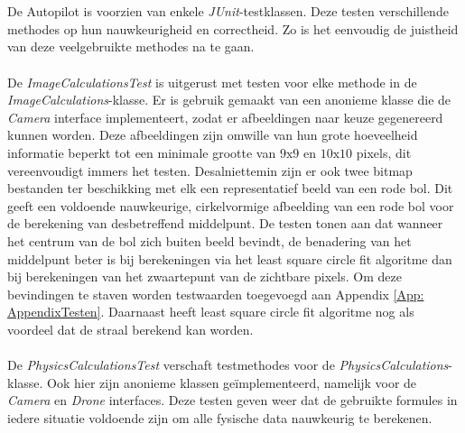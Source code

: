 \\
\\
De Autopilot is voorzien van enkele \textit{JUnit}-testklassen. Deze testen verschillende methodes op hun nauwkeurigheid en correctheid. Zo is het eenvoudig de juistheid van deze veelgebruikte methodes na te gaan.
\\
\\
De \textit{ImageCalculationsTest} is uitgerust met testen voor elke methode in de \textit{ImageCalculations}-klasse. Er is gebruik gemaakt van een anonieme klasse die de \textit{Camera} interface implementeert, zodat er afbeeldingen naar keuze gegenereerd kunnen worden. Deze afbeeldingen zijn omwille van hun grote hoeveelheid informatie beperkt tot een minimale grootte van \(9\text{x}9\) en \(10\text{x}10\) pixels, dit vereenvoudigt immers het testen. Desalniettemin zijn er ook twee bitmap bestanden ter beschikking met elk een representatief beeld van een rode bol. Dit geeft een voldoende nauwkeurige, cirkelvormige afbeelding van een rode bol voor de berekening van desbetreffend middelpunt. De testen tonen aan dat wanneer het centrum van de bol zich buiten beeld bevindt, de benadering van het middelpunt beter is bij berekeningen via het least square circle fit algoritme dan bij berekeningen van het zwaartepunt van de zichtbare pixels. Om deze bevindingen te staven worden testwaarden toegevoegd aan Appendix \ref{App: AppendixTesten}. Daarnaast heeft least square circle fit algoritme nog als voordeel dat de straal berekend kan worden.
\\
\\
De \textit{PhysicsCalculationsTest} verschaft testmethodes voor de \textit{PhysicsCalculations}-klasse. Ook hier zijn anonieme klassen ge\"implementeerd, namelijk voor de \textit{Camera} en \textit{Drone} interfaces. Deze testen geven weer dat de gebruikte formules in iedere situatie voldoende zijn om alle fysische data nauwkeurig te berekenen.
